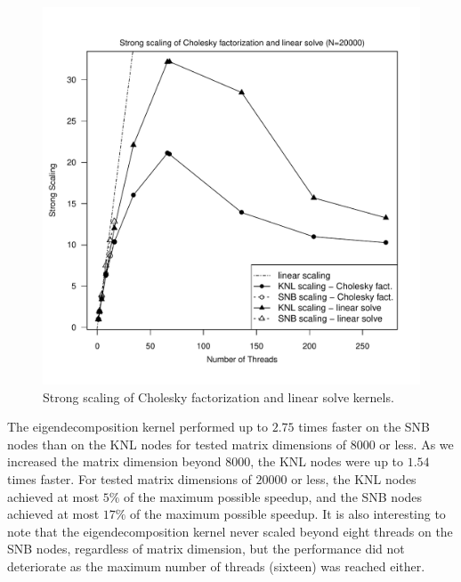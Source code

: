 \begin{figure}
\includegraphics[height=\columnwidth, width=\columnwidth]{chol_solve_20000_272-ss.pdf}
\caption{Strong scaling of Cholesky factorization and linear solve kernels.}
\end{figure}

The eigendecomposition kernel performed up to $2.75$ times faster on
  the SNB nodes than on the KNL nodes for tested matrix dimensions of $8000$ or
  less.
As we increased the matrix dimension beyond $8000$, the KNL nodes
  were up to $1.54$ times faster.
For tested matrix dimensions of $20000$ or less, the KNL nodes
  achieved at most $5\%$ of the maximum possible speedup, and the SNB
  nodes achieved at most $17\%$ of the maximum possible speedup.
It is also interesting to note that the eigendecomposition kernel never scaled
  beyond eight threads on the SNB nodes, regardless of matrix dimension, but the
  performance did not deteriorate as the maximum number of threads (sixteen)
  was reached either.

